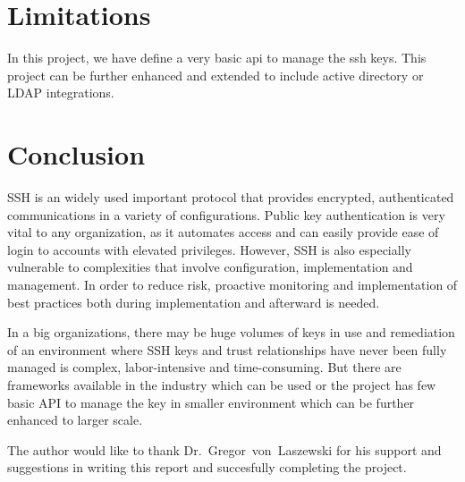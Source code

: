 \section{Limitations}

In this project, we have define a very basic api to manage the ssh keys.
This project can be further enhanced and extended to include active directory 
or LDAP integrations.


\section{Conclusion}

SSH is an widely used important protocol that provides encrypted, 
authenticated communications in a variety of configurations. Public key
authentication is very vital to any organization, as it automates 
access and can easily provide ease of login to accounts with elevated 
privileges. However, SSH is also especially vulnerable to complexities
that involve configuration, implementation and management. In order to
reduce risk, proactive monitoring and implementation of best practices 
both during implementation and afterward is needed. 

In a big organizations, there may be huge volumes of keys in use and
remediation of an environment where SSH keys and trust relationships 
have never been fully managed is complex, labor-intensive and 
time-consuming. But there are frameworks available in the industry which 
can be used or the project has few basic API to manage the key in smaller 
environment which can be further enhanced to larger scale.


\begin{acks}
The author would like to thank Dr.~Gregor~von~Laszewski for his support and 
suggestions in writing this report and succesfully completing the project.
\end{acks}










